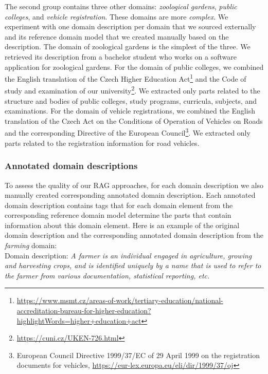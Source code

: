 The second group contains three other domains: \emph{zoological gardens}, \emph{public colleges}, and \emph{vehicle registration}.
These domains are more \emph{complex}. We experiment with one domain description per domain that we sourced externally and its reference domain model that we created manually based on the description.
The domain of zoological gardens is the simplest of the three.
We retrieved its description from a bachelor student who works on a software application for zoological gardens.
For the domain of public colleges, we combined the English translation of the Czech Higher Education Act\footnote{\url{https://www.msmt.cz/areas-of-work/tertiary-education/national-accreditation-bureau-for-higher-education?highlightWords=higher+education+act}} and the Code of study and examination of our university\footnote{\url{https://cuni.cz/UKEN-726.html}}.
We extracted only parts related to the structure and bodies of public colleges, study programs, curricula, subjects, and examinations.
For the domain of vehicle registrations, we combined the English translation of the Czech Act on the Conditions of Operation of Vehicles on Roads and the corresponding Directive of the European Council\footnote{European Council Directive 1999/37/EC of 29 April 1999 on the registration documents for vehicles, \url{https://eur-lex.europa.eu/eli/dir/1999/37/oj}}.
We extracted only parts related to the registration information for road vehicles.


\subsubsection{Annotated domain descriptions}

To assess the quality of our RAG approaches, for each domain description we also manually created corresponding annotated domain description. Each annotated domain description contains tags that for each domain element from the corresponding reference domain model determine the parts that contain information about this domain element. Here is an example of the original domain description and the corresponding annotated domain description from the \emph{farming} domain: \\

\noindent{}Domain description: \textit{A farmer is an individual engaged in agriculture, growing and harvesting crops, and is identified uniquely by a name that is used to refer to the farmer from various documentation, statistical reporting, etc.} \\

